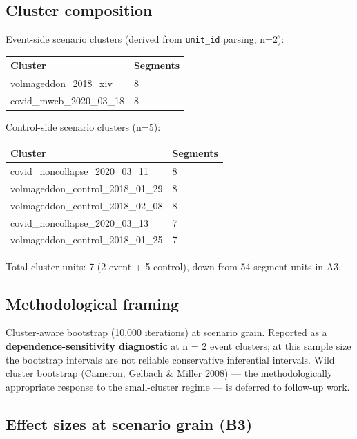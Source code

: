 \documentclass[
  11pt,
]{article}
\newcounter{none} %
\begin{document}
\subsection{Cluster composition}\label{cluster-composition}

Event-side scenario clusters (derived from \texttt{unit\_id} parsing;
n=2):

{\def\LTcaptype{none} %
\begin{longtable}[]{@{}ll@{}}
\toprule\noalign{}
Cluster & Segments \\
\midrule\noalign{}
\endhead
\bottomrule\noalign{}
\endlastfoot
volmageddon\_2018\_xiv & 8 \\
covid\_mwcb\_2020\_03\_18 & 8 \\
\end{longtable}
}

Control-side scenario clusters (n=5):

{\def\LTcaptype{none} %
\begin{longtable}[]{@{}ll@{}}
\toprule\noalign{}
Cluster & Segments \\
\midrule\noalign{}
\endhead
\bottomrule\noalign{}
\endlastfoot
covid\_noncollapse\_2020\_03\_11 & 8 \\
volmageddon\_control\_2018\_01\_29 & 8 \\
volmageddon\_control\_2018\_02\_08 & 8 \\
covid\_noncollapse\_2020\_03\_13 & 7 \\
volmageddon\_control\_2018\_01\_25 & 7 \\
\end{longtable}
}

Total cluster units: 7 (2 event + 5 control), down from 54 segment units
in A3.

\subsection{Methodological framing}\label{methodological-framing}

Cluster-aware bootstrap (10,000 iterations) at scenario grain. Reported
as a \textbf{dependence-sensitivity diagnostic} at n = 2 event clusters;
at this sample size the bootstrap intervals are not reliable
conservative inferential intervals. Wild cluster bootstrap (Cameron,
Gelbach \& Miller 2008) --- the methodologically appropriate response to
the small-cluster regime --- is deferred to follow-up work.

\subsection{Effect sizes at scenario grain
(B3)}\label{effect-sizes-at-scenario-grain-b3}
\end{document}
